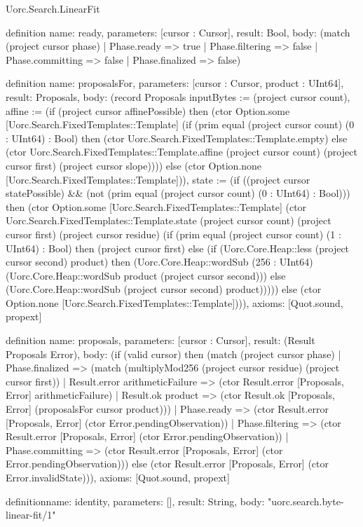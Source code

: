 \begin{lexlean}{Uorc.Search.LinearFit}
\begin{semanticmodule}
definition{
  name: ready,
  parameters: [cursor : Cursor],
  result: Bool,
  body: (match (project cursor phase)
    | Phase.ready => true
    | Phase.filtering => false
    | Phase.committing => false
    | Phase.finalized => false)
}

definition{
  name: proposalsFor,
  parameters: [cursor : Cursor, product : UInt64],
  result: Proposals,
  body: (record Proposals {inputBytes := (project cursor count), affine := (if (project cursor affinePossible) then (ctor Option.some [Uorc.Search.FixedTemplates::Template] (if (prim equal (project cursor count) (0 : UInt64) : Bool) then (ctor Uorc.Search.FixedTemplates::Template.empty) else (ctor Uorc.Search.FixedTemplates::Template.affine (project cursor count) (project cursor first) (project cursor slope)))) else (ctor Option.none [Uorc.Search.FixedTemplates::Template])), state := (if ((project cursor statePossible) && (not (prim equal (project cursor count) (0 : UInt64) : Bool))) then (ctor Option.some [Uorc.Search.FixedTemplates::Template] (ctor Uorc.Search.FixedTemplates::Template.state (project cursor count) (project cursor first) (project cursor residue) (if (prim equal (project cursor count) (1 : UInt64) : Bool) then (project cursor first) else (if (Uorc.Core.Heap::less (project cursor second) product) then (Uorc.Core.Heap::wordSub (256 : UInt64) (Uorc.Core.Heap::wordSub product (project cursor second))) else (Uorc.Core.Heap::wordSub (project cursor second) product))))) else (ctor Option.none [Uorc.Search.FixedTemplates::Template]))}),
  axioms: [Quot.sound, propext]
}

definition{
  name: proposals,
  parameters: [cursor : Cursor],
  result: (Result Proposals Error),
  body: (if (valid cursor) then (match (project cursor phase)
    | Phase.finalized => (match (multiplyMod256 (project cursor residue) (project cursor first))
      | Result.error arithmeticFailure => (ctor Result.error [Proposals, Error] arithmeticFailure)
      | Result.ok product => (ctor Result.ok [Proposals, Error] (proposalsFor cursor product)))
    | Phase.ready => (ctor Result.error [Proposals, Error] (ctor Error.pendingObservation))
    | Phase.filtering => (ctor Result.error [Proposals, Error] (ctor Error.pendingObservation))
    | Phase.committing => (ctor Result.error [Proposals, Error] (ctor Error.pendingObservation))) else (ctor Result.error [Proposals, Error] (ctor Error.invalidState))),
  axioms: [Quot.sound, propext]
}

definition{name: identity, parameters: [], result: String, body: "uorc.search.byte-linear-fit/1"}


\end{semanticmodule}
\end{lexlean}
